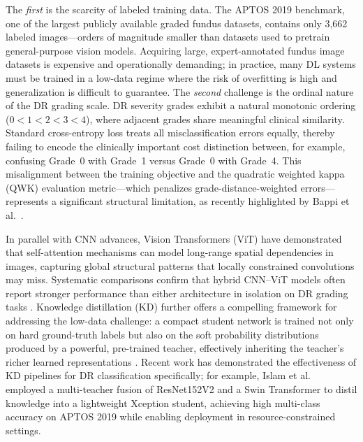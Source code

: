 \documentclass[a4paper,fleqn]{cas-dc}
\begin{document}
The \textit{first} is the scarcity of labeled training data. The APTOS 2019 benchmark, one of the largest publicly available graded fundus datasets, contains only 3,662 labeled images---orders of magnitude smaller than datasets used to pretrain general-purpose vision models. Acquiring large, expert-annotated fundus image datasets is expensive and operationally demanding; in practice, many DL systems must be trained in a low-data regime where the risk of overfitting is high and generalization is difficult to guarantee. The \textit{second} challenge is the ordinal nature of the DR grading scale. DR severity grades exhibit a natural monotonic ordering ($0 < 1 < 2 < 3 < 4$), where adjacent grades share meaningful clinical similarity. Standard cross-entropy loss treats all misclassification errors equally, thereby failing to encode the clinically important cost distinction between, for example, confusing Grade~0 with Grade~1 versus Grade~0 with Grade~4. This misalignment between the training objective and the quadratic weighted kappa (QWK) evaluation metric---which penalizes grade-distance-weighted errors---represents a significant structural limitation, as recently highlighted by Bappi et al.\ \cite{bappi2025}.

In parallel with CNN advances, Vision Transformers (ViT) \cite{dosovitskiy2021} have demonstrated that self-attention mechanisms can model long-range spatial dependencies in images, capturing global structural patterns that locally constrained convolutions may miss. Systematic comparisons confirm that hybrid CNN--ViT models often report stronger performance than either architecture in isolation on DR grading tasks \cite{zhang2025}. Knowledge distillation (KD) further offers a compelling framework for addressing the low-data challenge: a compact student network is trained not only on hard ground-truth labels but also on the soft probability distributions produced by a powerful, pre-trained teacher, effectively inheriting the teacher's richer learned representations \cite{hinton2015}. Recent work has demonstrated the effectiveness of KD pipelines for DR classification specifically; for example, Islam et al.\ \cite{islam2023} employed a multi-teacher fusion of ResNet152V2 and a Swin Transformer to distil knowledge into a lightweight Xception student, achieving high multi-class accuracy on APTOS 2019 while enabling deployment in resource-constrained settings.
\end{document}
